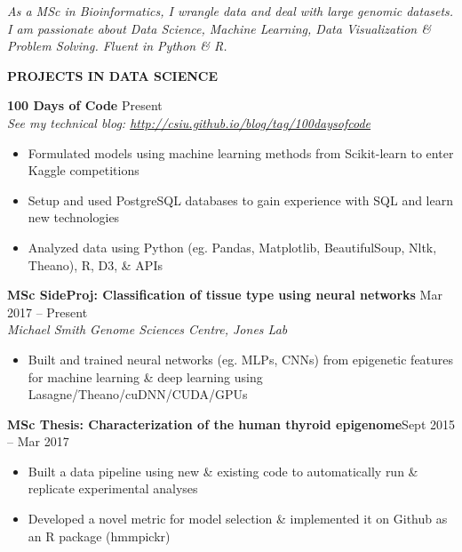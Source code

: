 \documentclass{res}
\renewcommand{\section}[1]{%
  \vspace{0.3in}%
  \centerline{\uppercase{\bf{#1}}}%
  \vspace{-6pt}}
\newcommand{\linehead}[2]{%
  {\bf #1} \hfill #2\\}
\newcommand{\linetitle}[1]{%
  {\sl #1}}
\begin{document}
\begin{resume}


\vspace{-1em}
\begin{center}
  {\it As a MSc in Bioinformatics, I wrangle data and deal with large genomic datasets. I am passionate about Data Science, Machine Learning, Data Visualization \& Problem Solving. Fluent in Python \& R.}
\end{center}
\vspace{-1.5em}

\section{Projects in Data science}

\linehead{100 Days of Code}{Present}
\linetitle{See my technical blog: \url{http://csiu.github.io/blog/tag/100daysofcode}}
\begin{itemize}
  \item Formulated models using machine learning methods from Scikit-learn to enter Kaggle competitions
  \item Setup and used PostgreSQL databases to gain experience with SQL and learn new technologies
  \item Analyzed data using Python (eg. Pandas, Matplotlib, BeautifulSoup, Nltk, Theano), R, D3, \& APIs
\end{itemize}

\linehead{MSc SideProj: Classification of tissue type using neural networks}{Mar 2017 -- Present}
\linetitle{Michael Smith Genome Sciences Centre, Jones Lab}
\begin{itemize}
  \item Built and trained neural networks (eg. MLPs, CNNs) from epigenetic features for machine learning \& deep learning using Lasagne/Theano/cuDNN/CUDA/GPUs
\end{itemize}
\vspace{-0.5em}
{\bf MSc Thesis: Characterization of the human thyroid epigenome}\hfill{Sept 2015 -- Mar 2017}
\begin{itemize}
  \item Built a data pipeline using new \& existing code to automatically run \& replicate experimental analyses
  \item Developed a novel metric for model selection \& implemented it on Github as an R package (hmmpickr)
\end{itemize}


\end{resume}
\end{document}
